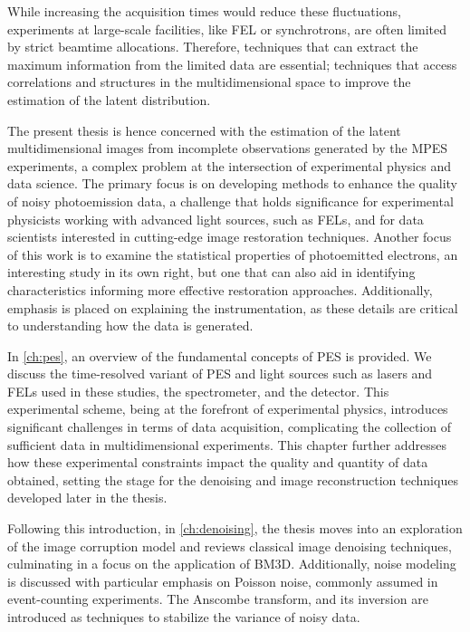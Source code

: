 While increasing the acquisition times would reduce these fluctuations, experiments at large-scale facilities, like \gls{FEL} or synchrotrons, are often limited by strict \gls{beamtime} allocations. Therefore, techniques that can extract the maximum information from the limited data are essential; techniques that access correlations and structures in the multidimensional space to improve the estimation of the latent distribution.

The present thesis is hence concerned with the estimation of the latent multidimensional images from incomplete observations generated by the \gls{MPES} experiments, a complex problem at the intersection of experimental physics and data science. The primary focus is on developing methods to enhance the quality of noisy photoemission data, a challenge that holds significance for experimental physicists working with advanced light sources, such as \glspl{FEL}, and for data scientists interested in cutting-edge image restoration techniques. Another focus of this work is to examine the statistical properties of photoemitted electrons, an interesting study in its own right, but one that can also aid in identifying characteristics informing more effective restoration approaches. Additionally, emphasis is placed on explaining the instrumentation, as these details are critical to understanding how the data is generated.

In \cref{ch:pes}, an overview of the fundamental concepts of \gls{PES} is provided. We discuss the time-resolved variant of \gls{PES} and light sources such as lasers and \glspl{FEL} used in these studies, the spectrometer, and the detector. This experimental scheme, being at the forefront of experimental physics, introduces significant challenges in terms of data acquisition, complicating the collection of sufficient data in multidimensional experiments. This chapter further addresses how these experimental constraints impact the quality and quantity of data obtained, setting the stage for the denoising and image reconstruction techniques developed later in the thesis.

Following this introduction, in \cref{ch:denoising}, the thesis moves into an exploration of the image corruption model and reviews  classical image denoising techniques, culminating in a focus on the application of \gls{BM3D}. Additionally, noise modeling is discussed with particular emphasis on Poisson noise, commonly assumed in event-counting experiments. The Anscombe transform, and its inversion are introduced as techniques to stabilize the variance of noisy data.

